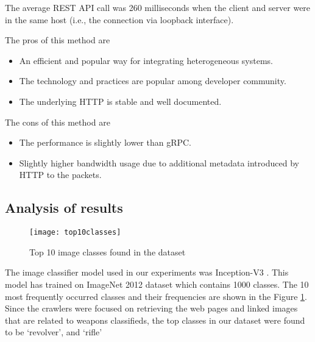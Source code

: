 The average REST API call was 260 milliseconds when the client and server were in the same host (i.e., the connection via loopback interface).

The pros of this method are
\begin{itemize}
	\item An efficient and popular way for integrating heterogeneous systems.
	\item The technology and practices are popular among developer community.
	\item The underlying HTTP is stable and well documented.
\end{itemize}

The cons of this method are
\begin{itemize}
	\item The performance is slightly lower than gRPC.
	\item Slightly higher bandwidth usage due to additional metadata introduced by HTTP to the packets.
\end{itemize}
\fi  %

\subsection{Analysis of results}
\begin{figure}[h]
	\texttt{[image: top10classes]}
	\caption{Top 10 image classes found in the dataset}
	\label{fig:top10ImgClass}
\end{figure}
The image classifier model used in our experiments was Inception-V3 \cite{SzegedyVISW15}. This model has trained on ImageNet 2012 dataset which contains 1000 classes\cite{ILSVRC15}.
The 10 most frequently occurred classes and their frequencies are shown in the Figure \ref{fig:top10ImgClass}. Since the crawlers were focused on retrieving the web pages and linked images that are related to weapons classifieds, the top classes in our dataset were found to be `revolver', and `rifle'

